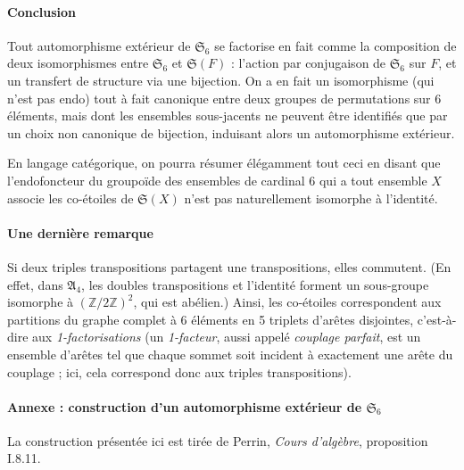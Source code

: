 \documentclass[a4paper, 11pt]{article}
\def\Z{\mathbb{Z}}
\def\Sigmap{\mathfrak{S}}
\begin{document}
\paragraph{Conclusion} Tout automorphisme extérieur de $\Sigmap_6$ se factorise
en fait comme la composition de deux isomorphismes entre $\Sigmap_6$ et
$\Sigmap(F)$ : l'action par conjugaison de $\Sigmap_6$ sur $F$, et un transfert
de structure via une bijection. On a en fait un isomorphisme (qui n'est pas
endo) tout à fait canonique entre deux groupes de permutations sur 6 éléments,
mais dont les ensembles sous-jacents ne peuvent être identifiés que par un choix
non canonique de bijection, induisant alors un automorphisme extérieur.

En langage catégorique, on pourra résumer élégamment tout ceci en disant que
l'endofoncteur du groupoïde des ensembles de cardinal 6 qui a tout ensemble $X$
associe les co-étoiles de $\Sigmap(X)$ n'est pas naturellement isomorphe à
l'identité.


\paragraph{Une dernière remarque} Si deux triples transpositions partagent une
transpositions, elles commutent. (En effet, dans $\mathfrak{A}_4$, les doubles
transpositions et l'identité forment un sous-groupe isomorphe à $(\Z/2\Z)^2$,
qui est abélien.) Ainsi, les co-étoiles correspondent aux partitions du graphe
complet à 6 éléments en 5 triplets d'arêtes disjointes, c'est-à-dire aux
\emph{1-factorisations} (un \emph{1-facteur}, aussi appelé \emph{couplage
  parfait}, est un ensemble d'arêtes tel que chaque sommet soit incident à
exactement une arête du couplage ; ici, cela correspond donc aux
triples transpositions).

\paragraph{Annexe : construction d'un automorphisme extérieur de $\Sigmap_6$} La
construction présentée ici est tirée de Perrin, \emph{Cours d'algèbre},
proposition I.8.11.
\end{document}
